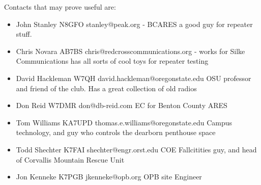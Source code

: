 \documentclass[10pt,letterpaper]{article}
\begin{document}
Contacts that may prove useful are:
\begin{itemize}
	\item John Stanley N8GFO stanley@peak.org - BCARES a good guy for repeater stuff.
	\item Chris Novara AB7BS chris@redcrosscommunications.org - works for Silke Communications has all sorts of cool toys for repeater testing
	\item David Hackleman W7QH david.hackleman@oregonstate.edu OSU professor and friend of the club. Has a great collection of old radios
	\item Don Reid W7DMR don@db-reid.com EC for Benton County ARES
	\item Tom Williams KA7UPD thomas.e.williams@oregonstate.edu Campus technology, and guy who controls the dearborn penthouse space
	\item Todd Shechter K7FAI shechter@engr.orst.edu COE Fallcitities guy, and head of Corvallis Mountain Rescue Unit
	\item Jon Kenneke K7PGB jkenneke@opb.org OPB site Engineer
\end{itemize}
\end{document}
